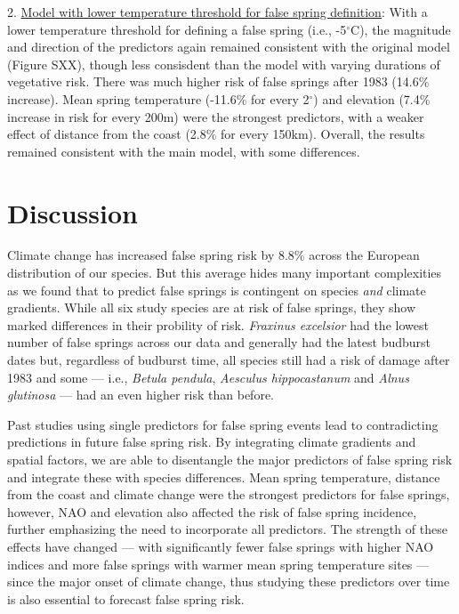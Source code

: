 \documentclass{article}\usepackage[]{graphicx}\usepackage[]{color}
\begin{document}
2. \underline{Model with lower temperature threshold for false spring definition}: With a lower temperature threshold for defining a false spring (i.e., -5$^{\circ}$C), the magnitude and direction of the predictors again remained consistent with the original model (Figure SXX), though less consisdent than the model with varying durations of vegetative risk. There was much higher risk of false springs after 1983 (14.6\% increase). Mean spring temperature (-11.6\% for every 2$^\circ$) and elevation (7.4\% increase in risk for every 200m) were the strongest predictors, with a weaker effect of distance from the coast (2.8\% for every 150km). Overall, the results remained consistent with the main model, with some differences. %

\section*{Discussion}
Climate change has increased false spring risk by 8.8\% across the European distribution of our species. But this average hides many important complexities as we found that to predict false springs is contingent on species \textit{and} climate gradients. While all six study species are at risk of false springs, they show marked differences in their probility of risk. \textit{Fraxinus excelsior} had the lowest number of false springs across our data and generally had the latest budburst dates but, regardless of budburst time, all species still had a risk of damage after 1983 and some  --- i.e., \textit{Betula pendula}, \textit{Aesculus hippocastanum} and \textit{Alnus glutinosa} --- had an even higher risk than before. 

Past studies using single predictors for false spring events \citep{Liu2018, Ma2018, Vitasse2018, Vitra2017, Wypych2016a} lead to contradicting predictions in future false spring risk. By integrating climate gradients and spatial factors, we are able to disentangle the major predictors of false spring risk and integrate these with species differences. Mean spring temperature, distance from the coast and climate change were the strongest predictors for false springs, however, NAO and elevation also affected the risk of false spring incidence, further emphasizing the need to incorporate all predictors. The strength of these effects have changed --- with significantly fewer false springs with higher NAO indices and more false springs with warmer mean spring temperature sites --- since the major onset of climate change, thus studying these predictors over time is also essential to forecast false spring risk.
\end{document}
